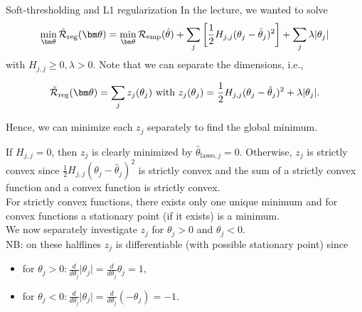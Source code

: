 \documentclass[11pt,compress,t,notes=noshow, xcolor=table]{beamer}
\begin{document}




\begin{vbframe}{Soft-thresholding and L1 regularization}
In the lecture, we wanted to solve
     \[
      \min_{\thetav} \mathcal{\tilde R}_{\text{reg}}(\thetav) =  \min_{\thetav}\mathcal{R}_{\text{emp}}(\thetah) + \sum_j \left[ \frac{1}{2} H_{j,j} (\theta_j - \hat{\theta}_j)^2 \right] + \sum_j \lambda |\theta_j|
      \]
with $H_{j,j} \geq 0, \lambda > 0$. Note that we can separate the dimensions, i.e.,

\[\mathcal{\tilde R}_{\text{reg}}(\thetav) = \sum_j z_j(\theta_j) \text{ with } z_j(\theta_j) = \frac{1}{2} H_{j,j} (\theta_j - \hat{\theta}_j)^2 + \lambda |\theta_j|.\]
      
Hence, we can minimize each $z_j$ separately to find the global minimum. \\
\lz

If $H_{j,j} = 0$, then $z_j$ is clearly minimized by $\hat{\theta}_{\text{lasso},j} = 0.$ Otherwise, $z_j$ is strictly convex since $\frac{1}{2} H_{j,j} (\theta_j - \hat{\theta}_j)^2$ is strictly convex and the sum of a strictly convex function and a convex function is strictly convex. \\


\framebreak
For strictly convex functions, there exists only one unique minimum and for convex functions a stationary point (if it exists) is a minimum. \\
\lz 
We now separately investigate $z_j$ for $\theta_j > 0$ and $\theta_j < 0.$\\
\lz
NB: on these halflines $z_j$ is differentiable (with possible stationary point) since
\begin{itemize}
    \item for $\theta_j > 0: \frac{d}{d\theta_j}\vert \theta_j\vert = \frac{d}{d\theta_j}\theta_j = 1,$
    \item for $\theta_j < 0: \frac{d}{d\theta_j}\vert \theta_j\vert = \frac{d}{d\theta_j}\left(-\theta_j\right) = -1$.
\end{itemize}


\end{vbframe}
\end{document}
